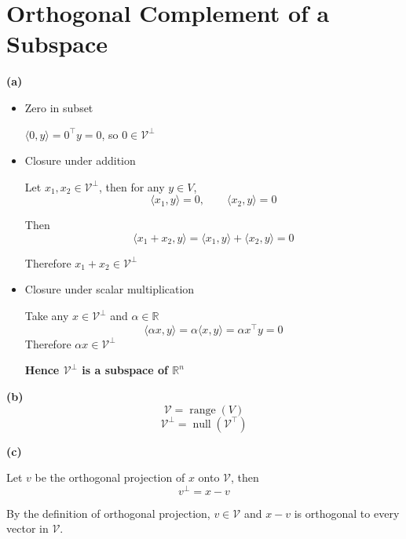 \section{Orthogonal Complement of a Subspace}

\textbf{(a)}
\begin{itemize}
    \item Zero in subset

    \(\langle 0,y\rangle=0^{\top}y=0\), so \(0\in \mathcal{V}^\perp\)
    \item Closure under addition
    
    Let \(x_1,x_2\in \mathcal{V}^\perp\), then for any \(y\in V\),
\[
\langle x_1, y \rangle = 0, \qquad 
\langle x_2, y \rangle = 0
\]

    Then
\[
    \langle x_1 + x_2,y\rangle
    =
    \langle x_1,y\rangle+\langle x_2,y\rangle
    =
    0
\]

Therefore \(x_1+x_2\in \mathcal{V}^\perp\)
    \item Closure under scalar multiplication
    
    Take any \(x\in \mathcal{V}^\perp\) and \(\alpha\in\mathbb{R}\)
\[
    \langle \alpha x,y\rangle
    =
    \alpha\langle x,y\rangle
    =
    \alpha x^{\top}y
    =
    0
\]
Therefore \(\alpha x \in \mathcal{V}^{\perp}\)

\textbf{Hence \(\mathcal{V}^\perp\) is a subspace of \(\mathbb{R}^n\)}

\end{itemize}

\textbf{(b)}
\[
    \mathcal{V}=\operatorname{range}(V)
\]
\[
    \mathcal{V}^\perp=\operatorname{null}(\mathcal{V}^{\top})
\]

\textbf{(c)}

Let \(v\) be the orthogonal projection of \(x\) onto \(\mathcal{V}\), then
\[
    v^\perp=x-v
\]

By the definition of orthogonal projection, \(v\in \mathcal{V}\) and \(x-v\) is orthogonal to every vector in \(\mathcal{V}\).

